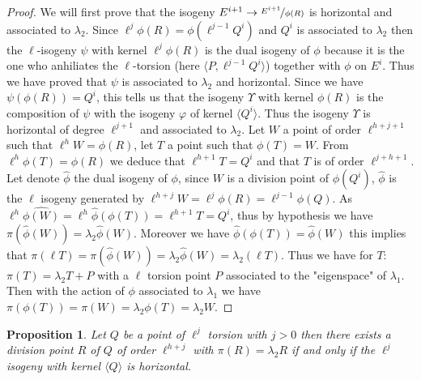 \documentclass{article}
\theoremstyle{plain}
\newtheorem{prop}[thm]{Proposition}
\theoremstyle{definition}
\theoremstyle{remark}
\begin{document}
\begin{proof}
We will first prove that the isogeny $E^{i+1} \rightarrow \nicefrac{E^{i+1}}{\phi(R)}$ is horizontal and associated to $\lambda_2$.
\newline
Since $\ell^j\phi(R)=\phi(\ell^{j-1}Q^i)$ and $Q^i$ is associated to $\lambda_2$ then the $\ell$-isogeny $\psi$ with kernel $\ell^{j}\phi(R)$ is the dual isogeny of $\phi$ because it is the one who anhiliates the $\ell$-torsion (here $\langle P, \ell^{j-1}Q^i \rangle$) together with $\phi$ on $E^i$. Thus we have proved that $\psi$ is associated to $\lambda_2$ and horizontal. 
\newline
Since we have $\psi(\phi(R))=Q^i$, this tells us that the isogeny $\Upsilon$ with kernel $\phi(R)$ is the composition of $\psi$ with the isogeny $\varphi$ of kernel $\langle Q^i \rangle$. Thus the isogeny $\Upsilon$ is horizontal of degree $\ell^{j+1}$ and associated to $\lambda_2$.
\newline
Let $W$ a point of order $\ell^{h+j+1}$ such that $\ell^hW=\phi(R)$, let $T$ a point such that $\phi(T)=W$. From $\ell^h\phi(T)=\phi(R)$ we deduce that $\ell^{h+1}T=Q^i$ and that $T$ is of order $\ell^{j+h+1}$. Let denote $\widehat{\phi}$ the dual isogeny of $\phi$, since $W$ is a division point of $\phi(Q^i)$, $\widehat{\phi}$ is the $\ell$ isogeny generated by $\ell^{h+j}W=\ell^j\phi(R)=\ell^{j-1}\phi(Q)$. As $\ell^{h}\widehat{\phi(W)}=\ell^h\widehat{\phi}(\phi(T))=\ell^{h+1}T=Q^i$, thus by hypothesis we have $\pi(\widehat{\phi}(W))=\lambda_2\widehat{\phi}(W)$. Moreover we have $\widehat{\phi} (\phi(T))=\widehat{\phi}(W)$ this implies that $\pi(\ell T)=\pi(\widehat{\phi}(W))=\lambda_2\widehat{\phi}(W)=\lambda_2(\ell T)$. Thus we have for $T$: $\pi(T)=\lambda_2 T + P$ with a $\ell$ torsion point $P$ associated to the "eigenspace" of $\lambda_1$. Then with the action of $\phi$ associated to $\lambda_1$ we have $\pi(\phi(T))=\pi(W)=\lambda_2\phi(T)=\lambda_2W$. 
\end{proof}

\begin{prop}
Let $Q$ be a point of $\ell^j$ torsion with $j>0$ then there exists a division point $R$ of $Q$ of order $\ell^{h+j}$ with $\pi(R)=\lambda_2R$ if and only if the $\ell^j$ isogeny with kernel $\langle Q \rangle $ is horizontal.
\end{prop}
\end{document}
